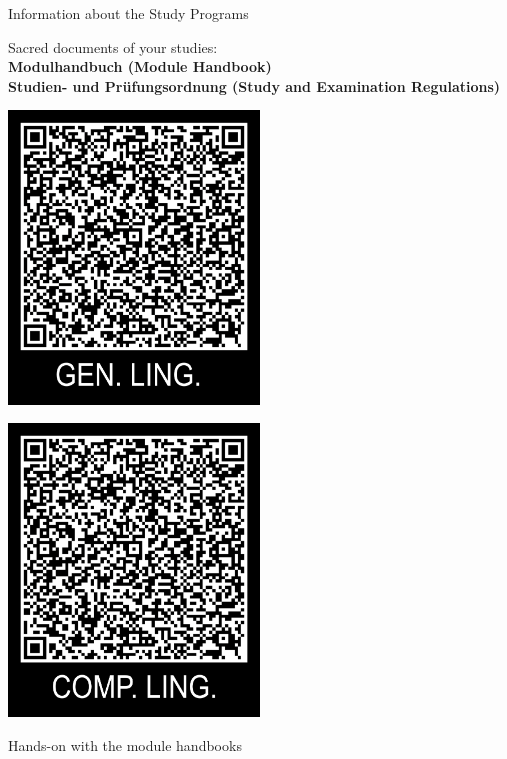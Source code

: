 \documentclass[aspectratio=169,hyperref={unicode},xcolor={dvipsnames}]{beamer}
\begin{document}
\begin{frame}{Information about the Study Programs}
\begin{center} Sacred documents of your studies:\\\large \textbf{Modulhandbuch (Module Handbook)\\Studien- und Prüfungsordnung (Study and Examination Regulations)}
\vfill

\begin{minipage}{0.4\textwidth}
\centering
    \includegraphics[width=0.5\textwidth]{../QRtemplate_2.png}
  \end{minipage}
  \hfill
  \begin{minipage}{0.4\textwidth}
  \centering
    \includegraphics[width=0.5\textwidth]{../QRtemplate_3.png}
  \end{minipage}
  
\end{center}

\end{frame}
\begin{frame}
	\centering \huge Hands-on with the module handbooks
\end{frame}
\end{document}
